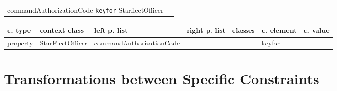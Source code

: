 \documentclass{llncs}
\newcommand{\ms}[1]{\texttt{#1}}
\newenvironment{gcotable}{
  \scriptsize
  \sffamily
  \vspace{0.3cm}
	\begin{center}
  \begin{tabular}{l|l|l|l|l|l|l}
  \hline
  \textbf{c. type} & \textbf{context class} & \textbf{left p. list} & \textbf{right p. list} & \textbf{classes} & \textbf{c. element} & \textbf{c. value} \\
  \hline

}{
  \hline
  \end{tabular}
	\end{center}
}
\newenvironment{DL}{
  \vspace{0.3cm}
	\begin{center}
  \begin{tabular}{r l}

}{
  \end{tabular}
	\end{center}
}
\begin{document}
\begin{DL}
commandAuthorizationCode \ms{keyfor} StarfleetOfficer
\end{DL}

\begin{gcotable}
property & StarFleetOfficer & commandAuthorizationCode & - & - & keyfor & - \\
\end{gcotable}


%
%
%

\section{Transformations between Specific Constraints}
\label{sec:transformations}
\end{document}
